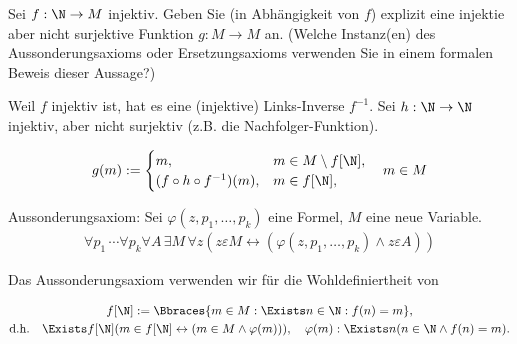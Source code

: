 
\begin{exercise}[269]

Sei $f: \N \to M$ injektiv.
Geben Sie (in Abhängigkeit von $f$) explizit eine injektie aber nicht surjektive Funktion $g: M \to M$ an.
(Welche Instanz(en) des Aussonderungsaxioms oder Ersetzungsaxioms verwenden Sie in einem formalen Beweis dieser Aussage?)

\end{exercise}


\begin{solution}

Weil $f$ injektiv ist, hat es eine (injektive) Links-Inverse $f^{-1}$.
Sei $h: \N \to \N$ injektiv, aber nicht surjektiv (z.B. die Nachfolger-Funktion).

\begin{align*}
    g(m)
    :=
    \begin{cases}
        m,                           & m \in M \setminus f[\N], \\
        (f \circ h \circ f^{-1})(m), & m \in f[\N],
    \end{cases}
    \quad
    m \in M
\end{align*}

Aussonderungsaxiom: Sei $\varphi(z,p_1,\dots,p_k)$ eine Formel, $M$ eine neue Variable.
\begin{align*}
  \forall p_1\, \cdots \forall p_k \forall A\, \exists M\, \forall z (z \varepsilon M
  \leftrightarrow (\varphi(z,p_1,\dots,p_k) \land z \varepsilon A))
\end{align*}

Das Aussonderungsaxiom verwenden wir für die Wohldefiniertheit von

\begin{multline*}
    f[\N] := \Bbraces{m \in M: \Exists n \in \N: f(n) = m}, \\
    \text{d.h.}
    \quad
    \Exists f[\N] (m \in f[\N] \leftrightarrow (m \in M \land \varphi(m))),
    \quad
    \varphi(m): \Exists n (n \in \N \land f(n) = m).
\end{multline*}

\end{solution}
